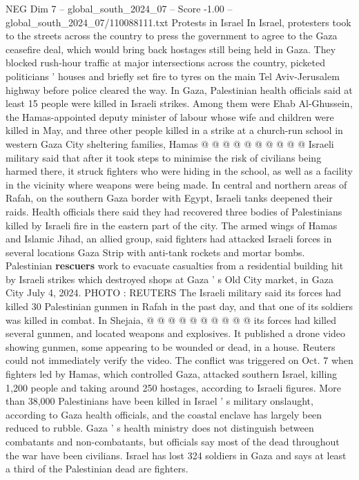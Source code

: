 \begin{textsample}{NEG Dim 7 – global\_south\_2024\_07 – Score -1.00 – global\_south\_2024\_07/110088111.txt}
Protests in Israel In Israel, protesters took to the streets across the country to press the government to agree to the Gaza ceasefire deal, which would bring back hostages still being held in Gaza.
They blocked rush-hour traffic at major intersections across the country, picketed politicians ' houses and briefly set fire to tyres on the main Tel Aviv-Jerusalem highway before police cleared the way.
In Gaza, Palestinian health officials said at least 15 people were killed in Israeli strikes.
Among them were Ehab Al-Ghussein, the Hamas-appointed deputy minister of labour whose wife and children were killed in May, and three other people killed in a strike at a church-run school in western Gaza City sheltering families, Hamas @ @ @ @ @ @ @ @ @ @ Israeli military said that after it took steps to minimise the risk of civilians being harmed there, it struck fighters who were hiding in the school, as well as a facility in the vicinity where weapons were being made.
In central and northern areas of Rafah, on the southern Gaza border with Egypt, Israeli tanks deepened their raids.
Health officials there said they had recovered three bodies of Palestinians killed by Israeli fire in the eastern part of the city.
The armed wings of Hamas and Islamic Jihad, an allied group, said fighters had attacked Israeli forces in several locations Gaza Strip with anti-tank rockets and mortar bombs.
Palestinian \textbf{rescuers} work to evacuate casualties from a residential building hit by Israeli strikes which destroyed shops at Gaza ' s Old City market, in Gaza City July 4, 2024.
PHOTO : REUTERS The Israeli military said its forces had killed 30 Palestinian gunmen in Rafah in the past day, and that one of its soldiers was killed in combat.
In Shejaia, @ @ @ @ @ @ @ @ @ @ its forces had killed several gunmen, and located weapons and explosives.
It published a drone video showing gunmen, some appearing to be wounded or dead, in a house.
Reuters could not immediately verify the video.
The conflict was triggered on Oct. 7 when fighters led by Hamas, which controlled Gaza, attacked southern Israel, killing 1,200 people and taking around 250 hostages, according to Israeli figures.
More than 38,000 Palestinians have been killed in Israel ' s military onslaught, according to Gaza health officials, and the coastal enclave has largely been reduced to rubble.
Gaza ' s health ministry does not distinguish between combatants and non-combatants, but officials say most of the dead throughout the war have been civilians.
Israel has lost 324 soldiers in Gaza and says at least a third of the Palestinian dead are fighters.

\end{textsample}
